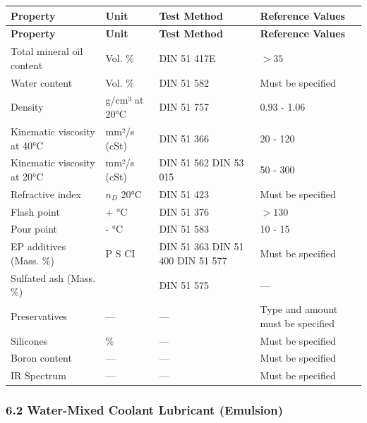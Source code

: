 \begin{longtable}{|p{6cm}|p{3cm}|p{3.5cm}|p{3.5cm}|}
    \hline
    \textbf{Property} & \textbf{Unit} & \textbf{Test Method} & \textbf{Reference Values} \\
    \hline
    \endfirsthead

    \hline
    \textbf{Property} & \textbf{Unit} & \textbf{Test Method} & \textbf{Reference Values} \\
    \hline
    \endhead

    \hline
    \endfoot

    \hline
    \endlastfoot

    Total mineral oil content & Vol. \% & DIN 51 417E & $> 35$ \\
    \hline
    Water content & Vol. \% & DIN 51 582 & Must be specified \\
    \hline
    Density & g/cm³ at 20°C & DIN 51 757 & 0.93 - 1.06 \\
    \hline
    Kinematic viscosity at 40°C & mm²/s (cSt) & DIN 51 366 & 20 - 120 \\
    \hline
    Kinematic viscosity at 20°C & mm²/s (cSt) & DIN 51 562 \newline DIN 53 015 & 50 - 300 \\
    \hline
    Refractive index & $n_D$ 20°C & DIN 51 423 & Must be specified \\
    \hline
    Flash point & + °C & DIN 51 376 & $> 130$ \\
    \hline
    Pour point & - °C & DIN 51 583 & 10 - 15 \\
    \hline
    EP additives (Mass. \%) & P \newline S \newline CI & DIN 51 363 \newline DIN 51 400 \newline DIN 51 577 & Must be specified \\
    \hline
    Sulfated ash (Mass. \%) &  & DIN 51 575 & --- \\
    \hline
    Preservatives & --- & --- & Type and amount must be specified \\
    \hline
    Silicones & \% & --- & Must be specified \\
    \hline
    Boron content & --- & --- & Must be specified \\
    \hline
    IR Spectrum & --- & --- & Must be specified \\
    \hline
\end{longtable}

\subsubsection*{6.2 Water-Mixed Coolant Lubricant (Emulsion)}

